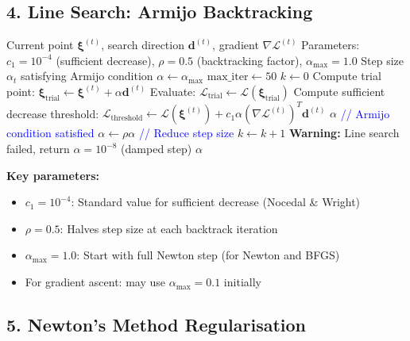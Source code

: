 \documentclass[11pt,a4paper]{article}
\begin{document}
\subsection*{4. Line Search: Armijo Backtracking}

\begin{algorithm}[H]
\caption{Armijo Backtracking Line Search}
\begin{algorithmic}[1]
\REQUIRE Current point $\bm{\xi}^{(t)}$, search direction $\bm{d}^{(t)}$, gradient $\nabla \mathcal{L}^{(t)}$
\REQUIRE Parameters: $c_1 = 10^{-4}$ (sufficient decrease), $\rho = 0.5$ (backtracking factor), $\alpha_{\max} = 1.0$
\ENSURE Step size $\alpha_t$ satisfying Armijo condition
\STATE $\alpha \leftarrow \alpha_{\max}$
\STATE $\text{max\_iter} \leftarrow 50$
\STATE $k \leftarrow 0$
    \STATE Compute trial point: $\bm{\xi}_{\text{trial}} \leftarrow \bm{\xi}^{(t)} + \alpha \bm{d}^{(t)}$
    \STATE Evaluate: $\mathcal{L}_{\text{trial}} \leftarrow \mathcal{L}(\bm{\xi}_{\text{trial}})$
    \STATE Compute sufficient decrease threshold: $\mathcal{L}_{\text{threshold}} \leftarrow \mathcal{L}(\bm{\xi}^{(t)}) + c_1 \alpha (\nabla \mathcal{L}^{(t)})^T \bm{d}^{(t)}$
        \RETURN $\alpha$ \quad \textcolor{blue}{// Armijo condition satisfied}
    \ENDIF
    \STATE $\alpha \leftarrow \rho \alpha$ \quad \textcolor{blue}{// Reduce step size}
    \STATE $k \leftarrow k + 1$
\ENDWHILE
\STATE \textbf{Warning:} Line search failed, return $\alpha = 10^{-8}$ (damped step)
\RETURN $\alpha$
\end{algorithmic}
\end{algorithm}

\textbf{Key parameters:}
\begin{itemize}
\item $c_1 = 10^{-4}$: Standard value for sufficient decrease (Nocedal \& Wright)
\item $\rho = 0.5$: Halves step size at each backtrack iteration
\item $\alpha_{\max} = 1.0$: Start with full Newton step (for Newton and BFGS)
\item For gradient ascent: may use $\alpha_{\max} = 0.1$ initially
\end{itemize}

\subsection*{5. Newton's Method Regularisation}
\end{document}
